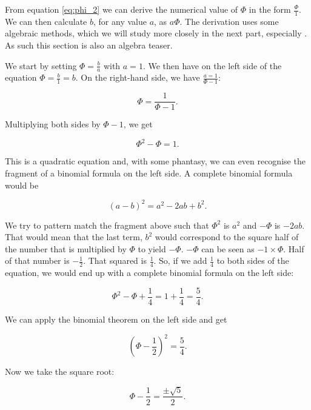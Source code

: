 \documentclass[tikz]{scrreprt}
\begin{document}
From equation \ref{eq:phi_2} we can derive
the numerical value of $\Phi$ in the form
$\frac{\Phi}{1}$.
We can then calculate $b$,
for any value $a$,
as $a\Phi$.
The derivation uses some algebraic methods,
which we will study more closely in the next part,
especially .
As such this section is also an algebra teaser.

We start by setting $\Phi = \frac{b}{a}$
with $a = 1$.
We then have on the left side of the equation
$\Phi = \frac{b}{1} = b$.
On the right-hand side, we have
$\frac{a=1}{\Phi - 1}$:

\begin{equation}
\Phi = \frac{1}{\Phi - 1}.
\end{equation}

Multiplying both sides by $\Phi - 1$,
we get 

\begin{equation}
\Phi^2 - \Phi = 1.
\end{equation}

This is a quadratic equation and,
with some phantasy, we can even
recognise the fragment of a binomial formula on the
left side. A complete binomial formula would be

\begin{equation}
(a-b)^2 = a^2-2ab+b^2.
\end{equation}

We try to pattern match the fragment above
such that $\Phi^2$ is $a^2$ and $-\Phi$
is $-2ab$. That would mean that the last term,
$b^2$ would correspond to the square half of the number
that is multiplied by $\Phi$ to yield $-\Phi$.
$-\Phi$ can be seen as $-1 \times \Phi$.
Half of that number is $-\frac{1}{2}$.
That squared is $\frac{1}{4}$.
So, if we add $\frac{1}{4}$ to both sides of the equation,
we would end up with a complete binomial formula on 
the left side:

\begin{equation}
\Phi^2 - \Phi + \frac{1}{4} = 1 + \frac{1}{4} = \frac{5}{4}.
\end{equation}

We can apply the binomial theorem on the left side and get

\begin{equation}
\left(\Phi - \frac{1}{2}\right)^2 = \frac{5}{4}.
\end{equation}

Now we take the square root:

\begin{equation}
\Phi - \frac{1}{2} = \frac{\pm\sqrt{5}}{2}.
\end{equation}
\end{document}
